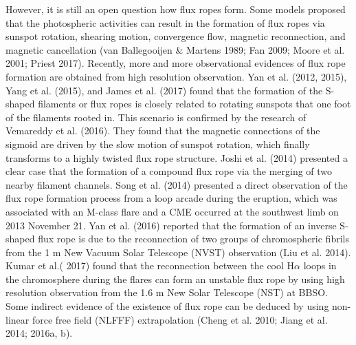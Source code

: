 \documentclass[12pt,preprint]{aastex}
\begin{document}
\begin{CJK*}{UTF8}{gbsn}
However, it is still an open question how flux ropes form. Some models proposed that the photospheric activities can result in the formation of flux ropes via sunspot rotation, shearing motion, convergence flow, magnetic reconnection, and magnetic cancellation (van Ballegooijen \& Martens 1989; Fan 2009; Moore et al. 2001; Priest 2017). Recently, more and more observational evidences of flux rope formation are obtained from high resolution observation. Yan et al. (2012, 2015), Yang et al. (2015), and James et al. (2017) found that the formation of the S-shaped filaments or flux ropes is closely related to rotating sunspots that one foot of the filaments rooted in. This scenario is confirmed by the research of Vemareddy et al. (2016). They found that the magnetic connections of the sigmoid are driven by the slow motion of sunspot rotation, which finally transforms to a highly twisted flux rope structure. Joshi et al. (2014) presented a clear case that the formation of a compound flux rope via the merging of two nearby filament channels. Song et al. (2014) presented a direct observation of the flux rope formation process from a loop arcade during the eruption, which was associated with an M-class flare and a CME occurred at the southwest limb on 2013 November 21. Yan et al. (2016) reported that the formation of an inverse S-shaped flux rope is due to the reconnection of two groups of chromospheric fibrils from the 1 m New Vacuum Solar Telescope (NVST) observation (Liu et al. 2014). Kumar et al.( 2017) found that the reconnection between the cool H$\alpha$ loops in the chromosphere during the flares can form an unstable flux rope by using high resolution observation from the 1.6 m New Solar Telescope (NST) at BBSO. Some indirect evidence of the existence of flux rope can be deduced by using non-linear force free field (NLFFF) extrapolation (Cheng et al. 2010; Jiang et al. 2014; 2016a, b). 


\end{CJK*}
\end{document}
